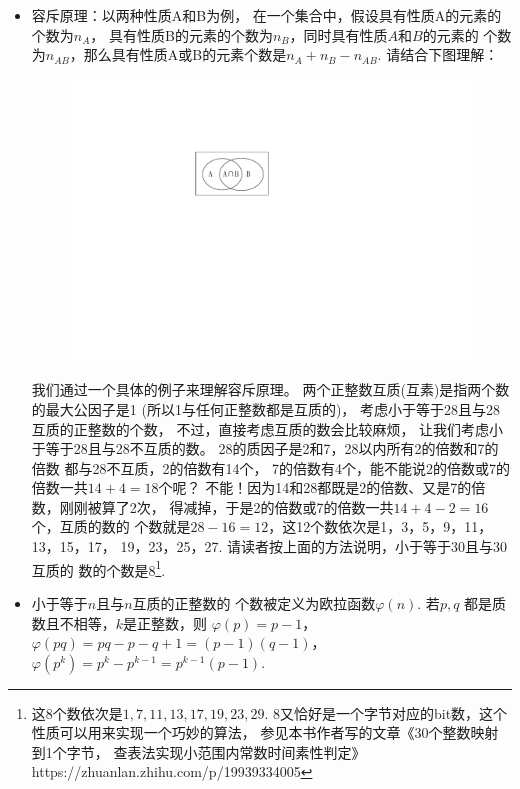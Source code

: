 \begin{itemize}[leftmargin=\inteval{\myitemleftmargin}pt,itemsep=
   \inteval{\myitemitempsep}pt,topsep=\inteval{\myitemtopsep}pt]
\item\label{容斥原理} 容斥原理：以两种性质A和B为例，
在一个集合中，假设具有性质A的元素的个数为$ n_A $，
具有性质B的元素的个数为$ n_B $，同时具有性质$ A $和$ B $的元素的
个数为$ n_{AB} $，那么具有性质A或B的元素个数是$ n_A+n_B-n_{AB} $.
请结合下图理解：
\begin{figure}[H]
    \centering
    \includegraphics[width=0.3\linewidth]{PDF_Picture/韦恩图-交集}
\end{figure}
我们通过一个具体的例子来理解容斥原理。
两个正整数互质(互素)是指两个数的最大公因子是1
(所以1与任何正整数都是互质的)，
考虑小于等于28且与28互质的正整数的个数，
不过，直接考虑互质的数会比较麻烦，
让我们考虑小于等于28且与28不互质的数。
28的质因子是2和7，28以内所有2的倍数和7的倍数
都与28不互质，2的倍数有14个，
7的倍数有4个，能不能说2的倍数或7的倍数一共$ 14+4=18 $个呢？
不能！因为14和28都既是2的倍数、又是7的倍数，刚刚被算了2次，
得减掉，于是2的倍数或7的倍数一共$ 14+4-2=16 $个，互质的数的
个数就是$ 28-16=12 $，这12个数依次是1，3，5，9，11，13，15，17，
19，23，25，27. 请读者按上面的方法说明，小于等于30且与30互质的
数的个数是8\footnote{这8个数依次是$ 1,7,11,13,17,19,23,29 $.\q 
    8又恰好是一个字节对应的bit数，这个性质可以用来实现一个巧妙的算法，
    参见本书作者写的文章《30个整数映射到1个字节，
    查表法实现小范围内常数时间素性判定》\\
    https://zhuanlan.zhihu.com/p/19939334005 }.

\item 小于等于$ n $且与$ n $互质的正整数的
个数被定义为欧拉函数$ \varphi(n) $. 
若$ p,q $ 都是质数且不相等，$ k $是正整数，则
$ \varphi(p)=p-1 $，$ \varphi(pq)=pq-p-q+1=(p-1)(q-1) $，
$ \varphi(p^k)=p^k-p^{k-1}=p^{k-1}(p-1) $.


\end{itemize}
